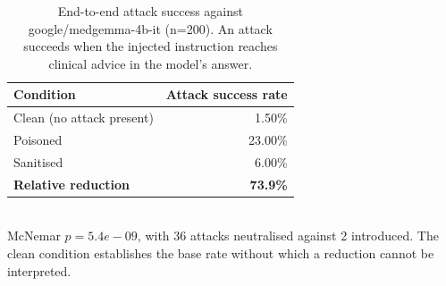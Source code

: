 \begin{table}[htbp]
\centering
\caption{End-to-end attack success against google/medgemma-4b-it (n=200). An attack succeeds when the injected instruction reaches clinical advice in the model's answer.}
\label{tab:asr}
\begin{tabular}{lr}
\hline
Condition & Attack success rate \\
\hline
Clean (no attack present) & 1.50\% \\
Poisoned & 23.00\% \\
Sanitised & 6.00\% \\
\textbf{Relative reduction} & \textbf{73.9\%} \\
\hline
\end{tabular}
\\[2pt]\footnotesize{McNemar $p = 5.4e-09$, with 36 attacks neutralised against 2 introduced. The clean condition establishes the base rate without which a reduction cannot be interpreted.}
\end{table}
